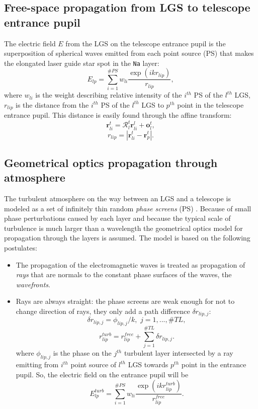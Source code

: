 \subsection{Free-space propagation from LGS to telescope entrance pupil}
\label{sec:free-space-propagation}

The electric field $E$ from the LGS on the telescope entrance pupil is the
superposition of spherical waves emitted from each point source (PS) that
makes the elongated laser guide star spot in the \texttt{Na} layer:
\begin{equation} \label{eq:spherical-superposition}
	E_{lp} = \sum_{i=1}^{\#PS} w_{li} \frac{\exp(i k r_{lip})}{r_{lip}},
\end{equation}
where $w_{li}$ is the weight describing relative intensity of the $i^{th}$ PS
of the $l^{th}$ LGS, $r_{lip}$ is the distance from the $i^{th}$ PS
of the $l^{th}$ LGS to $p^{th}$ point in the telescope entrance pupil. This
distance is easily found through the affine transform:
\begin{equation} \label{eq:source-to-pupil}
	\bm{r}_{li}^{t} = \mathcal{R}_{l}^{t} \bm{r}_{li}^{l} + \bm{o}_{l}^{t},
\end{equation}
$$ r_{lip} = |\bm{r}_{li}^{t} - \bm{r}_{p}^{t}|. $$

\subsection{Geometrical optics propagation through atmosphere}
\label{sec:geom-propagation}

The turbulent atmosphere on the way between an LGS and a telescope is modeled
as a set of infinitely thin random \emph{phase screens} (PS)
. Because of small phase perturbations caused by each
layer and because the typical scale of turbulence is much larger than a
wavelength the geometrical optics model for propagation through the layers is
assumed. The model is based on the following postulates:
\begin{itemize}
	\item The propagation of the electromagnetic waves is treated as propagation
	of \emph{rays} that are normals to the constant phase surfaces of the waves,
	the \emph{wavefronts}.  
	\item Rays are always straight: the phase screens are weak enough for not
	to change direction of rays, they only add a path difference
	$\delta r_{lip,j}$:
	\begin{equation} \label{eq:path-diff}
		\delta r_{lip,j} = \phi_{lip,j}/k, \,\, j = 1,...,\#TL,
	\end{equation}
	$$ r_{lip}^{turb} = r_{lip}^{free} + \sum_{j=1}^{\#TL} \delta r_{lip,j}. $$
	where $\phi_{lip,j}$ is the phase on the $j^{th}$ turbulent layer
	intersected by a ray emitting from $i^{th}$ point source of $l^{th}$ LGS
	towards $p^{th}$ point in the entrance pupil. So, the electric field
	on the entrance pupil will be
	\begin{equation} \label{eq:spherical-superposition-turb}
		E^{turb}_{lp} =
		\sum_{i=1}^{\#PS} w_{li}
		\frac{\exp(i k r_{lip}^{turb})}{r_{lip}^{free}}.
	\end{equation}
\end{itemize}

